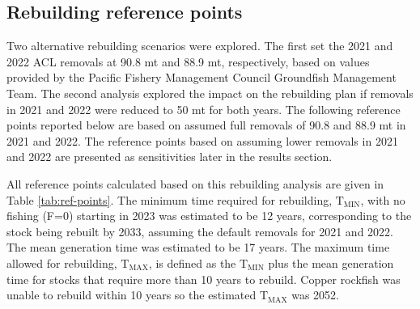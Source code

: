 \documentclass[11pt,
  english,
  a4paper,
]{article}
\begin{document}
\leavevmode\tagmcend\tagstructend


\hypertarget{rebuilding-reference-points}{%
\subsection{Rebuilding reference points}\label{rebuilding-reference-points}}

\leavevmode\tagmcend\tagstructend


Two alternative rebuilding scenarios were explored. The first set the 2021 and 2022 ACL removals at 90.8 mt and 88.9 mt, respectively, based on values provided by the Pacific Fishery Management Council Groundfish Management Team. The second analysis explored the impact on the rebuilding plan if removals in 2021 and 2022 were reduced to 50 mt for both years. The following reference points reported below are based on assumed full removals of 90.8 and 88.9 mt in 2021 and 2022. The reference points based on assuming lower removals in 2021 and 2022 are presented as sensitivities later in the results section.

\leavevmode\tagmcend\tagstructend\par


All reference points calculated based on this rebuilding analysis are given in Table \ref{tab:ref-points}. The minimum time required for rebuilding, {\(\text{T}_\text{MIN}\)\leavevmode\tagmcend\tagstructend}, with no fishing (F=0) starting in 2023 was estimated to be 12 years, corresponding to the stock being rebuilt by 2033, assuming the default removals for 2021 and 2022. The mean generation time was estimated to be 17 years. The maximum time allowed for rebuilding, {\(\text{T}_\text{MAX}\)\leavevmode\tagmcend\tagstructend}, is defined as the {\(\text{T}_\text{MIN}\)\leavevmode\tagmcend\tagstructend} plus the mean generation time for stocks that require more than 10 years to rebuild. Copper rockfish was unable to rebuild within 10 years so the estimated {\(\text{T}_\text{MAX}\)\leavevmode\tagmcend\tagstructend} was 2052.

\leavevmode\tagmcend\tagstructend\par
\end{document}
